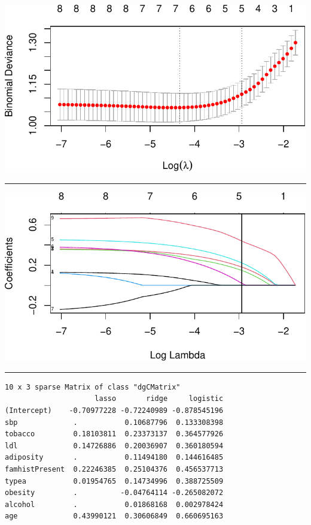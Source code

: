 \documentclass[
  letterpaper,
  DIV=11,
  numbers=noendperiod]{scrartcl}
\begin{document}
\includegraphics{L10_files/figure-pdf/unnamed-chunk-15-1.pdf}

\begin{center}\rule{0.5\linewidth}{0.5pt}\end{center}

\includegraphics{L10_files/figure-pdf/unnamed-chunk-16-1.pdf}

\begin{center}\rule{0.5\linewidth}{0.5pt}\end{center}

\begin{verbatim}
10 x 3 sparse Matrix of class "dgCMatrix"
                     lasso       ridge     logistic
(Intercept)    -0.70977228 -0.72240989 -0.878545196
sbp             .           0.10687796  0.133308398
tobacco         0.18103811  0.23373137  0.364577926
ldl             0.14726886  0.20036907  0.360180594
adiposity       .           0.11494180  0.144616485
famhistPresent  0.22246385  0.25104376  0.456537713
typea           0.01954765  0.14734996  0.388725509
obesity         .          -0.04764114 -0.265082072
alcohol         .           0.01868168  0.002978424
age             0.43990121  0.30606849  0.660695163
\end{verbatim}
\end{document}
